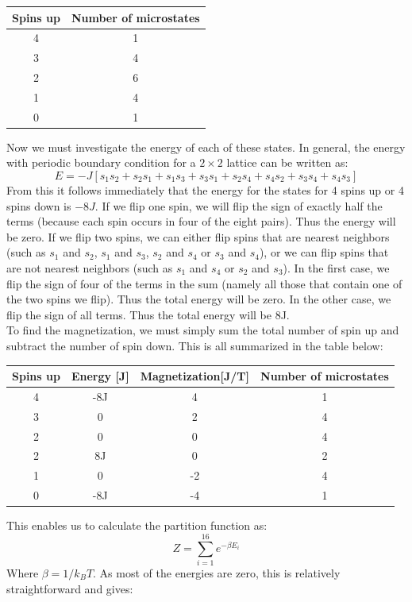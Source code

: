 \documentclass[a4paper, 10pt]{article}
\begin{document}
\begin{center}
\begin{tabular}{|c|c|}
\hline
Spins up & Number of microstates\\
\hline
4 & 1\\
3 & 4\\
2 & 6\\
1 & 4\\
0 & 1\\
\hline
\end{tabular}
\end{center}
Now we must investigate the energy of each of these states. In general, the energy with periodic boundary condition for a $2\times 2$ lattice can be written as:
$$E=-J\left[s_1s_2+s_2s_1+s_1s_3+s_3s_1+s_2s_4+s_4s_2+s_3s_4+s_4s_3\right]$$
From this it follows immediately that the energy for the states for 4 spins up or 4 spins down is $-8J$. If we flip one spin, we will flip the sign of exactly half the terms (because each spin occurs in four of the eight pairs). Thus the energy will be zero. If we flip two spins, we can either flip spins that are nearest neighbors (such as $s_1$ and $s_2$, $s_1$ and $s_3$, $s_2$ and $s_4$ or $s_3$ and $s_4$), or we can flip spins that are not nearest neighbors (such as $s_1$ and $s_4$ or $s_2$ and $s_3$). In the first case, we flip the sign of four of the terms in the sum (namely all those that contain one of the two  spins we flip). Thus the total energy will be zero. In the other case, we flip the sign of all terms. Thus the total energy will be 8J.\\
\linebreak
To find the magnetization, we must simply sum the total number of spin up and subtract the number of spin down. This is all summarized in the table below:
\begin{center}
\begin{tabular}{|c|c|c|c|}
\hline
Spins up &  Energy [J]& Magnetization[J/T] &Number of microstates\\
\hline
4 &-8J&4&1\\
3 &0 & 2 & 4\\
2 &0 &0 & 4\\
2 & 8J & 0 &2\\
1 &0&-2 & 4\\
0 & -8J & -4& 1\\
\hline
\end{tabular}
\end{center}
This enables us to calculate the partition function as:
$$Z=\sum_{i=1}^{16} e^{-\beta E_i}$$
Where $\beta=1/k_BT$. As most of the energies are zero, this is relatively straightforward and gives:
\end{document}
